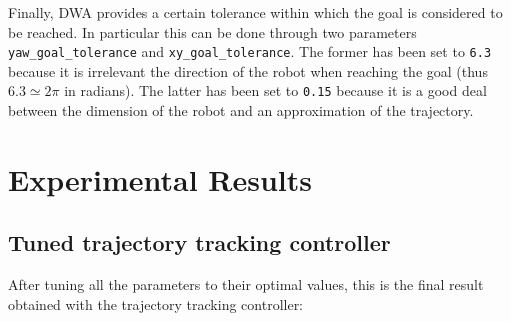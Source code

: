 \documentclass[11pt,a4paper]{article}
\begin{document}
Finally, DWA provides a certain tolerance within which the goal is considered to be reached.
In particular this can be done through two parameters \texttt{yaw\_goal\_tolerance} and \texttt{xy\_goal\_tolerance}.
The former has been set to \texttt{6.3} because it is irrelevant the direction of the robot when reaching the goal
(thus $6.3 \simeq 2\pi$ in radians).
The latter has been set to \texttt{0.15} because it is a good deal between the dimension of the robot and
an approximation of the trajectory.





\section{Experimental Results}


\subsection{Tuned trajectory tracking controller}

After tuning all the parameters to their optimal values, this is the final result obtained with the trajectory
tracking controller:
\end{document}
